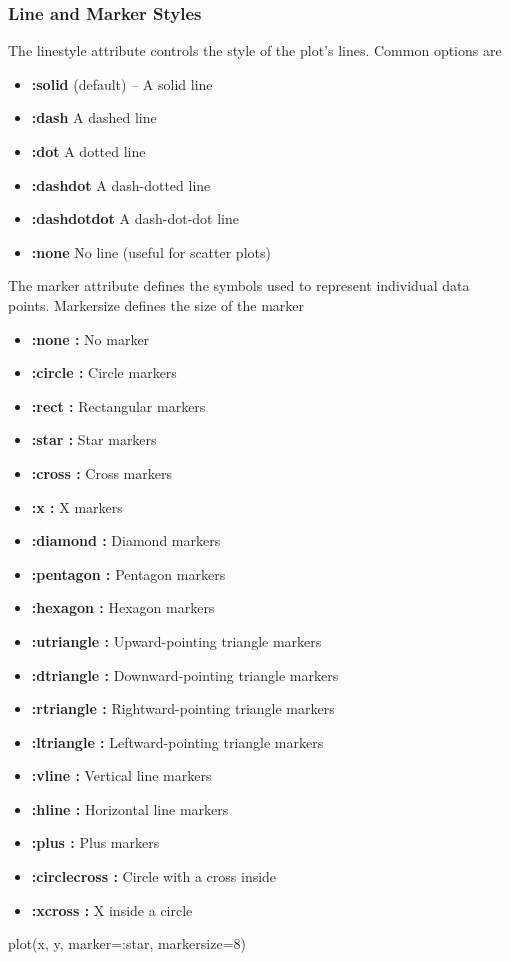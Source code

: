 \documentclass{report}
\begin{document}
     \subsubsection{Line and Marker Styles}
     \bigbreak \noindent 
     The linestyle attribute controls the style of the plot's lines. Common options are
     \begin{itemize}
         \item \textbf{:solid} (default) – A solid line
         \item \textbf{:dash} A dashed line
         \item \textbf{:dot} A dotted line
         \item \textbf{:dashdot}  A dash-dotted line
         \item \textbf{:dashdotdot}  A dash-dot-dot line
         \item \textbf{:none}  No line (useful for scatter plots)
     \end{itemize}
     \bigbreak \noindent 
     The marker attribute defines the symbols used to represent individual data points. Markersize defines the size of the marker
     \begin{itemize}
         \item \textbf{:none :} No marker
         \item \textbf{:circle :} Circle markers
         \item \textbf{:rect :} Rectangular markers
         \item \textbf{:star :} Star markers
         \item \textbf{:cross :} Cross markers
         \item \textbf{:x :} X markers
         \item \textbf{:diamond :} Diamond markers
         \item \textbf{:pentagon :} Pentagon markers
         \item \textbf{:hexagon :} Hexagon markers
         \item \textbf{:utriangle :} Upward-pointing triangle markers
         \item \textbf{:dtriangle :} Downward-pointing triangle markers
         \item \textbf{:rtriangle :} Rightward-pointing triangle markers
         \item \textbf{:ltriangle :} Leftward-pointing triangle markers
         \item \textbf{:vline :} Vertical line markers
         \item \textbf{:hline :} Horizontal line markers
         \item \textbf{:plus :} Plus markers
         \item \textbf{:circlecross :} Circle with a cross inside
         \item \textbf{:xcross :} X inside a circle
     \end{itemize}
     \bigbreak \noindent 
     \begin{jlcode}
     plot(x, y, marker=:star, markersize=8)
     \end{jlcode}
\end{document}
